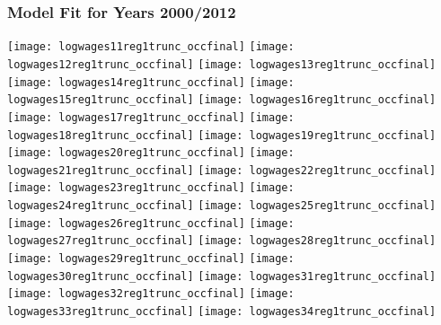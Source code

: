 \documentclass[12pt]{article}
\begin{document}
\subsubsection{Model Fit for Years 2000/2012}

\texttt{[image: logwages11reg1trunc\_occfinal]}
\newline
\texttt{[image: logwages12reg1trunc\_occfinal]}
\clearpage
\texttt{[image: logwages13reg1trunc\_occfinal]}
\newline
\texttt{[image: logwages14reg1trunc\_occfinal]}
\clearpage
\texttt{[image: logwages15reg1trunc\_occfinal]}
\newline
\texttt{[image: logwages16reg1trunc\_occfinal]}
\clearpage
\texttt{[image: logwages17reg1trunc\_occfinal]}
\newline
\texttt{[image: logwages18reg1trunc\_occfinal]}
\clearpage
\texttt{[image: logwages19reg1trunc\_occfinal]}
\newline
\texttt{[image: logwages20reg1trunc\_occfinal]}
\clearpage
\texttt{[image: logwages21reg1trunc\_occfinal]}
\newline
\texttt{[image: logwages22reg1trunc\_occfinal]}
\clearpage
\texttt{[image: logwages23reg1trunc\_occfinal]}
\newline
\texttt{[image: logwages24reg1trunc\_occfinal]}
\clearpage
\texttt{[image: logwages25reg1trunc\_occfinal]}
\newline
\texttt{[image: logwages26reg1trunc\_occfinal]}
\clearpage
\texttt{[image: logwages27reg1trunc\_occfinal]}
\newline
\texttt{[image: logwages28reg1trunc\_occfinal]}
\clearpage
\texttt{[image: logwages29reg1trunc\_occfinal]}
\newline
\texttt{[image: logwages30reg1trunc\_occfinal]}
\clearpage
\texttt{[image: logwages31reg1trunc\_occfinal]}
\newline
\texttt{[image: logwages32reg1trunc\_occfinal]}
\clearpage
\texttt{[image: logwages33reg1trunc\_occfinal]}
\newline
\texttt{[image: logwages34reg1trunc\_occfinal]}
\end{document}
